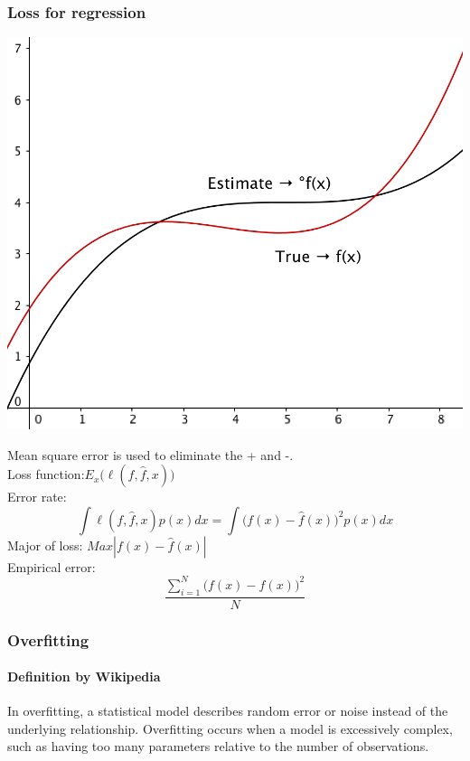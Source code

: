 \documentclass{article}
\begin{document}
{{{        \subsubsection{Loss for regression}{
            \begin{center}{
                \includegraphics[scale=0.5]{loss-regression.png}
            }
            \end{center}
             Mean square error is used to eliminate the + and -.\\
             Loss function:\(E_x\big(\ell(f,\hat{f},x)\big)\)\\
             Error rate: \[\int\ell(f,\hat{f},x)p(x)dx=\int\big(f(x)-\hat{f}(x)\big)^2p(x)dx\]
             Major of loss: \(Max|f(x)-\hat{f}(x)|\)\\
             Empirical error: \[\frac{\sum_{i=1}^{N}\big(f(x)-\hat{f}(x)\big)^2}{N}\]
        }
        \subsubsection{Overfitting}{    
            \paragraph{Definition by Wikipedia}{
                In overfitting, a statistical model describes random error or noise instead of the underlying relationship. Overfitting occurs when a model is excessively complex, such as having too many parameters relative to the number of observations.
            }

}}}}
\end{document}
